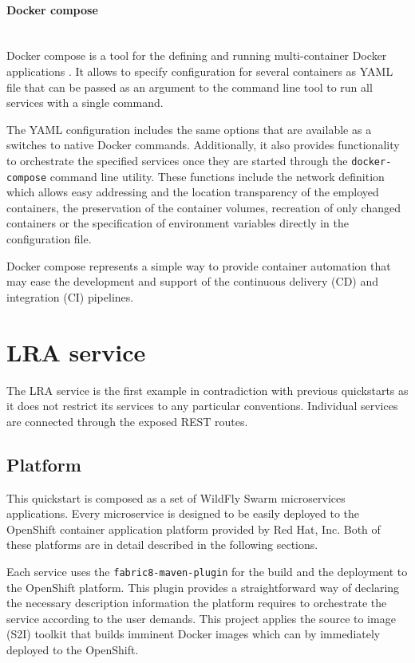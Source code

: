 \documentclass[oneside,
  digital, %
  table,   %
  nolof,     %
  nolot,     %
]{fithesis3}
\newcommand{\newlinepar}[1]{\paragraph{#1}\needspace{4\baselineskip}\mbox{}\\}
\begin{document}
\newlinepar{Docker compose}

Docker compose is a tool for the defining and running multi-container Docker applications \cite{docker_compose}. It allows to specify configuration for several containers as YAML file that can be passed as an argument to the command line tool to run all services with a single command.

The YAML configuration includes the same options that are available as a switches to native Docker commands. Additionally, it also provides functionality to orchestrate the specified services once they are started through the \texttt{docker-compose} command line utility. These functions include the network definition which allows easy addressing and the location transparency of the employed containers, the preservation of the container volumes, recreation of only changed containers or the specification of environment variables directly in the configuration file. 

Docker compose represents a simple way to provide container automation that may ease the development and support of the continuous delivery (CD) and integration (CI) pipelines.


\section{LRA service}

The LRA service is the first example in contradiction with previous quickstarts as it does not restrict its services to any particular conventions. Individual services are connected through the exposed REST routes.

\subsection{Platform}

This quickstart is composed as a set of WildFly Swarm microservices applications. Every microservice is designed to be easily deployed to the OpenShift container application platform provided by Red Hat, Inc. Both of these platforms are in detail described in the following sections.

Each service uses the \texttt{fabric8-maven-plugin} for the build and the deployment to the OpenShift platform. This plugin provides a straightforward way of declaring the necessary description information the platform requires to orchestrate the service according to the user demands. This project applies the source to image (S2I) toolkit that builds imminent Docker images which can by immediately deployed to the OpenShift. 
\end{document}
